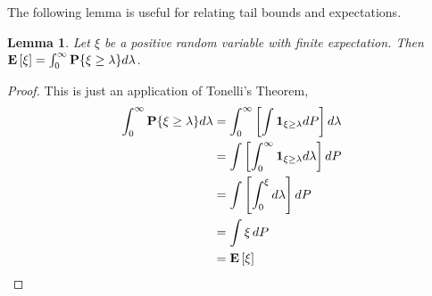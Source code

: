 \documentclass{amsart}
\newtheorem{lem}[thm]{Lemma}
\theoremstyle{remark}
\theoremstyle{definition}
\begin{document}
The following lemma is useful for relating tail bounds and expectations.
\begin{lem}\label{TailsAndExpectations}Let $\xi$ be a positive random variable with finite
  expectation.  Then $\textbf{E}\left[\xi\right] = \int_0^\infty \textbf{P}\{\xi \geq
    \lambda\} d\lambda$.
\end{lem}
\begin{proof}
This is just an application of Tonelli's Theorem,
\begin{align*}
\int_0^\infty \textbf{P}\{\xi \geq \lambda\}d\lambda &= \int_0^\infty \left[\int
\textbf{1}_{\xi \geq \lambda} dP\right] d\lambda \\
&= \int\left[\int_0^\infty \textbf{1}_{\xi \geq \lambda} d\lambda\right] dP \\
&= \int\left[\int_0^{\xi} d\lambda\right] dP \\
&= \int \xi \, dP \\
&= \textbf{E}\left[\xi\right] \\
\end{align*}
\end{proof}
\end{document}
